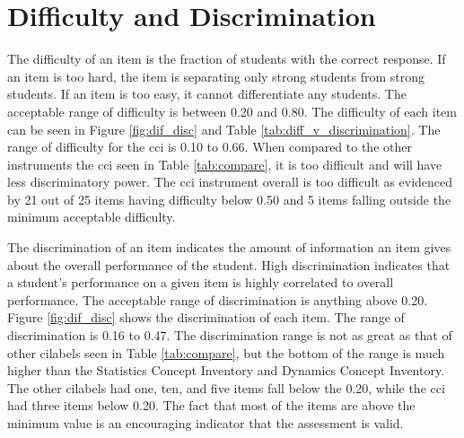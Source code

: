 \FloatBarrier
\section{Difficulty and Discrimination}

The difficulty of an item is the fraction of students with the correct response. If an item is too hard, the item is separating only strong students from strong students. If an item is too easy, it cannot differentiate any students. The acceptable range of difficulty is between 0.20 and 0.80. The difficulty of each item can be seen in Figure \ref{fig:dif_disc} and Table \ref{tab:diff_v_discrimination}. The range of difficulty for the \gls{cci} is 0.10 to 0.66. When compared to the other instruments the \gls{cci} seen in Table \ref{tab:compare}, it is too difficult and will have less discriminatory power. The \gls{cci} instrument overall is too difficult as evidenced by 21 out of 25 items having difficulty below 0.50 and 5 items falling outside the minimum acceptable difficulty. 

The discrimination of an item indicates the amount of information an item gives about the overall performance of the student. High discrimination indicates that a student's performance on a given item is highly correlated to overall performance. The acceptable range of discrimination is anything above 0.20.  Figure \ref{fig:dif_disc} shows the discrimination of each item. The range of discrimination is 0.16 to 0.47. The discrimination range is not as great as that of other \glspl{cilabel} seen in Table \ref{tab:compare}, but the bottom of the range is much higher than the Statistics Concept Inventory and Dynamics Concept Inventory. The other \glspl{cilabel} had one, ten, and five items fall below the 0.20, while the \gls{cci} had three items below 0.20. The fact that most of the items are above the minimum value is an encouraging indicator that the assessment is valid.   

\iffalse
\iflong
The correlation coefficient can be calculated for each item to quantify how similar the item fits in with the rest of the items. The correlation for each item can be seen in Figure \ref{fig:correlation}. 


\begin{figure}[!hbp]
    \begin{center}
    \advance\leftskip-3cm
    \advance\rightskip-3cm
    \texttt{[image: images/correlation.png]}
    \caption{Correlation}
    \label{fig:correlation}
\end{center}
\end{figure}
\fi
\fi


